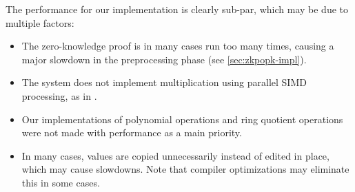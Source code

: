 \documentclass[../main.tex]{subfiles}
\begin{document}
The performance for our implementation is clearly sub-par, which may be due to multiple factors:
\begin{itemize}
    \item The zero-knowledge proof is in many cases run too many times, causing a major slowdown in the preprocessing phase (see \ref{sec:zkpopk-impl}).
    \item The system does not implement multiplication using parallel SIMD processing, as in \cite{damgaard2012multiparty}.
    \item Our implementations of polynomial operations and ring quotient operations were not made with performance as a main priority.
    \item In many cases, values are copied unnecessarily instead of edited in place, which may cause slowdowns. Note that compiler optimizations may eliminate this in some cases.
\end{itemize}
\end{document}
